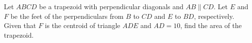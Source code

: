 Let $ABCD$ be a trapezoid with perpendicular diagonals and $AB\parallel CD$. Let $E$ and $F$ be the feet of the perpendiculars from $B$ to $CD$ and $E$ to $BD$, respectively. Given that $F$ is the centroid of triangle $ADE$ and $AD=10$, find the area of the trapezoid.
